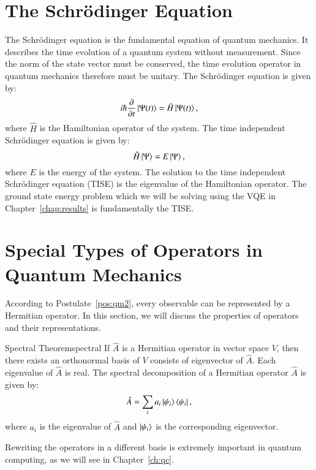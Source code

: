 \section{The Schr{\"o}dinger Equation}

The Schr{\"o}dinger equation is the fundamental equation of quantum mechanics. It describes the time evolution of a quantum system without measurement. Since the norm of the state vector must be conserved, the time evolution operator in quantum mechanics therefore must be unitary. The Schr{\"o}dinger equation is given by:
\begin{equation}
	\label{eq:schrodinger}
i\hbar\frac{\partial}{\partial t}\ket{\Psi(t)} = \hat H\ket{\Psi(t)},
\end{equation}
where $ \hat H $ is the Hamiltonian operator of the system. 
The time independent Schr{\"o}dinger equation is given by:
\begin{equation}
	\label{eq:time_independent_schrodinger}
	\hat H\ket{\Psi} = E\ket{\Psi},
\end{equation}
where $ E $ is the energy of the system. The solution to the time independent Schr{\"o}dinger equation (TISE) is the eigenvalue of the Hamiltonian operator. The ground state energy problem which we will be solving using the VQE in Chapter~\ref{chap:results} is fundamentally the TISE.

\section{Special Types of Operators in Quantum Mechanics}
According to Postulate~\ref{pos:qm2}, every observable can be represented by a Hermitian operator. In this section, we will discuss the properties of operators and their representations.

\begin{theorem}{Spectral Theorem}{spectral}
If $ \hat A $ is a Hermitian operator in vector space $ V $, then there exists an orthonormal basis of $ V $ consists of eigenvector of $ \hat A $. Each eigenvalue of $ \hat A $ is real.  The spectral decomposition of a Hermitian operator $ \hat A $ is given by:
\begin{equation}
	\hat A = \sum_{i} a_i \ket{\psi_i}\bra{\psi_i},
\end{equation}
where $ a_i $ is the eigenvalue of $ \hat A $ and $ \ket{\psi_i} $ is the corresponding eigenvector.
\end{theorem}
Rewriting the operators in a different basis is extremely important in quantum computing, as we will see in Chapter~\ref{ch:qc}.

